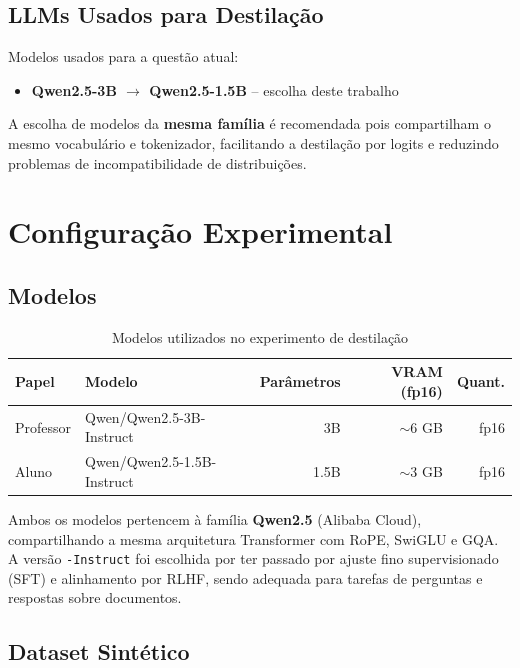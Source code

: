\documentclass[12pt, a4paper]{article}
\begin{document}
\subsection{LLMs Usados para Destilação}

Modelos usados para a questão atual:

\begin{itemize}
  \item \textbf{Qwen2.5-3B $\rightarrow$ Qwen2.5-1.5B} -- escolha deste trabalho
\end{itemize}

A escolha de modelos da \textbf{mesma família} é recomendada pois compartilham o mesmo
vocabulário e tokenizador, facilitando a destilação por logits e reduzindo problemas de
incompatibilidade de distribuições.

\section{Configuração Experimental}

\subsection{Modelos}

\begin{table}[H]
\centering
\caption{Modelos utilizados no experimento de destilação}
\begin{tabular}{llrrr}
\toprule
\textbf{Papel} & \textbf{Modelo} & \textbf{Parâmetros} & \textbf{VRAM (fp16)} & \textbf{Quant.} \\
\midrule
Professor & Qwen/Qwen2.5-3B-Instruct & 3B & $\sim$6 GB & fp16 \\
Aluno     & Qwen/Qwen2.5-1.5B-Instruct & 1.5B & $\sim$3 GB & fp16 \\
\bottomrule
\end{tabular}
\end{table}

Ambos os modelos pertencem à família \textbf{Qwen2.5} (Alibaba Cloud), compartilhando
a mesma arquitetura Transformer com RoPE, SwiGLU e GQA. A versão \texttt{-Instruct}
foi escolhida por ter passado por ajuste fino supervisionado (SFT) e alinhamento por
RLHF, sendo adequada para tarefas de perguntas e respostas sobre documentos.

\subsection{Dataset Sintético}
\end{document}
